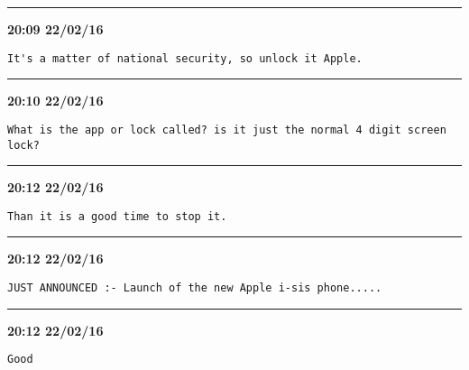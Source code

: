 \hrule%

\begin{adjustwidth}{0cm}{0cm}
\footnotesize \textbf{20:09 22/02/16}

\begin{lstlisting}[breaklines, breakatwhitespace, basicstyle=\small, frame=leftline]
It's a matter of national security, so unlock it Apple.
\end{lstlisting}
\end{adjustwidth}

\hrule%

\begin{adjustwidth}{0cm}{0cm}
\footnotesize \textbf{20:10 22/02/16}

\begin{lstlisting}[breaklines, breakatwhitespace, basicstyle=\small, frame=leftline]
What is the app or lock called? is it just the normal 4 digit screen lock?
\end{lstlisting}
\end{adjustwidth}

\hrule%

\begin{adjustwidth}{0cm}{0cm}
\footnotesize \textbf{20:12 22/02/16}

\begin{lstlisting}[breaklines, breakatwhitespace, basicstyle=\small, frame=leftline]
Than it is a good time to stop it.
\end{lstlisting}
\end{adjustwidth}

\hrule%

\begin{adjustwidth}{0cm}{0cm}
\footnotesize \textbf{20:12 22/02/16}

\begin{lstlisting}[breaklines, breakatwhitespace, basicstyle=\small, frame=leftline]
JUST ANNOUNCED :- Launch of the new Apple i-sis phone.....
\end{lstlisting}
\end{adjustwidth}

\hrule%

\begin{adjustwidth}{0cm}{0cm}
\footnotesize \textbf{20:12 22/02/16}

\begin{lstlisting}[breaklines, breakatwhitespace, basicstyle=\small, frame=leftline]
Good
\end{lstlisting}
\end{adjustwidth}

